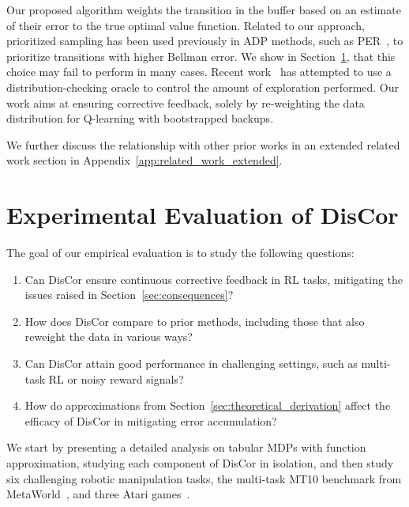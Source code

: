 \documentclass[jmlr]{article}
\begin{document}
Our proposed algorithm weights the transition in the buffer based on an estimate of their error to the true optimal value function.
Related to our approach, prioritized sampling has been used previously in ADP methods, such as PER~\citep{Schaul2015}, to prioritize transitions with higher Bellman error. We show in Section~\ref{sec:experiments}, that this choice may fail to perform in many cases. 
Recent work~\citep{du2019distributioncheck} has attempted to use a distribution-checking oracle to control the amount of exploration performed. Our work aims at ensuring corrective feedback, solely by re-weighting the data distribution for Q-learning with bootstrapped backups. 

We further discuss the relationship with other prior works in an extended related work section in  Appendix~\ref{app:related_work_extended}.
 \section{Experimental Evaluation of DisCor}
\label{sec:experiments}
The goal of our empirical evaluation is to study the following questions: 
\begin{enumerate}
    \item Can DisCor ensure continuous corrective feedback in RL tasks, mitigating the issues raised in Section~\ref{sec:consequences}? 
    \item How does DisCor compare to prior methods, including those that also reweight the data in various ways?
    \item Can DisCor attain good performance in challenging settings, such as multi-task RL or noisy reward signals?
    \item How do approximations from Section~\ref{sec:theoretical_derivation} affect the efficacy of DisCor in mitigating error accumulation?
\end{enumerate}
We start by presenting a detailed analysis on tabular MDPs with function approximation, studying each component of DisCor in isolation,
and then study six challenging robotic manipulation tasks, the multi-task MT10 benchmark from MetaWorld~\citep{yu2019meta}, and three Atari games~\citep{bellemare2013ale}.
\end{document}
